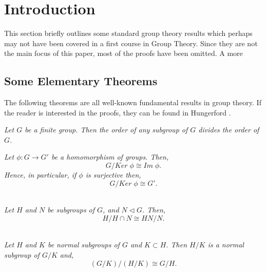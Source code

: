 \chapter{Introduction}\label{Ch1_Introduction}

This section briefly outlines some standard group theory results which perhaps may not have been covered in a first course in Group Theory. Since they are not the main focus of this paper, most of the proofs have been omitted. A more

\section{Some Elementary Theorems}

The following theorems are all well-known fundamental results in group theory. If the reader is interested in the proofs, they can be found in Hungerford \cite{hungerford}.

\begin{theorem}\label{lagrange} \textit{Let $G$ be a finite group. Then the order of any subgroup of $G$ divides the order of $G$.} \\
\end{theorem} 

\begin{theorem}\label{1stiso} \textit{Let $\phi  :G \rightarrow G'$ be a homomorphism of groups. Then, $$G/Ker \; \phi \cong Im \; \phi.$$ Hence, in particular, if $\phi$ is surjective then, $$G/Ker \; \phi \cong G'.$$} \\
\end{theorem} 

\vspace{-10mm}

\begin{theorem}\label{2ndiso} \textit{Let $H$ and $N$ be subgroups of $G$, and $N \vartriangleleft G$. Then, $$H/H \cap N \cong HN/N.$$} \\
\end{theorem} 

\vspace{-10mm}

\begin{theorem}\label{3rdiso} \textit{Let $H$ and $K$ be normal subgroups of $G$ and $K \subset H$. Then $H/K$ is a normal subgroup of $G/K$ and, $$(G/K)/(H/K) \cong G/H.$$} \\
\end{theorem} 

\vspace{-10mm}

